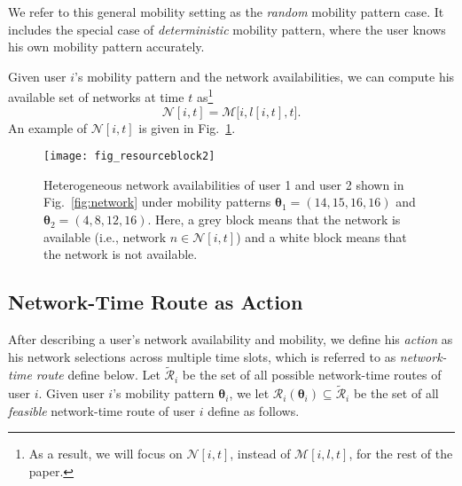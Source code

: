 \documentclass[journal]{IEEEtran}
\newcommand{\bs}[1]{\boldsymbol{#1}}
\begin{document}
  We refer to this general mobility setting as the \emph{random} mobility pattern case. It includes the special case of \emph{deterministic} mobility pattern, where the user knows his own mobility pattern accurately.
	
  Given user $i$'s mobility pattern and the network availabilities, we can compute his available set of networks at time $t$ as\footnote{As a result, we will focus on $\mathcal{N}[i,t]$, instead of $\mathcal{M}[i,l,t]$, for the rest of the paper.} %
%
\begin{equation} \label{equ:network_it}
	\mathcal{N}[i,t] = \mathcal{M}\bigl[ i,l[i,t],t \bigr].
\end{equation}
% 
An example of $\mathcal{N}[i,t]$ is given in Fig.~\ref{fig:resourceblock}.





\begin{figure}[t]
 \centering
	 \texttt{[image: fig\_resourceblock2]} %
 \caption{Heterogeneous network availabilities of user 1 and user 2 shown in Fig.~\ref{fig:network} under mobility patterns $\bs{\theta}_1 = (14,15,16,16)$ and $\bs{\theta}_2 = (4,8,12,16)$. Here, a grey block means that the network is available (i.e., network $n \in \mathcal{N}[i,t]$) and a white block means that the network is not available.}
\label{fig:resourceblock}
\end{figure} 




\subsection{Network-Time Route as Action} \label{sec:networktime}

  After describing a user's network availability and mobility, we define his \emph{action} as his network selections across multiple time slots, which is referred to as \emph{network-time route} define below. 
  Let $\tilde{\mathcal{R}}_i$ be the set of all possible network-time routes of user $i$.
	Given user $i$'s mobility pattern $\boldsymbol{\theta}_i$,  we let $\mathcal{R}_i(\boldsymbol{\theta}_i) \subseteq \tilde{\mathcal{R}}_i$ be the set of all \emph{feasible} network-time route of user $i$ define as follows.
\end{document}
